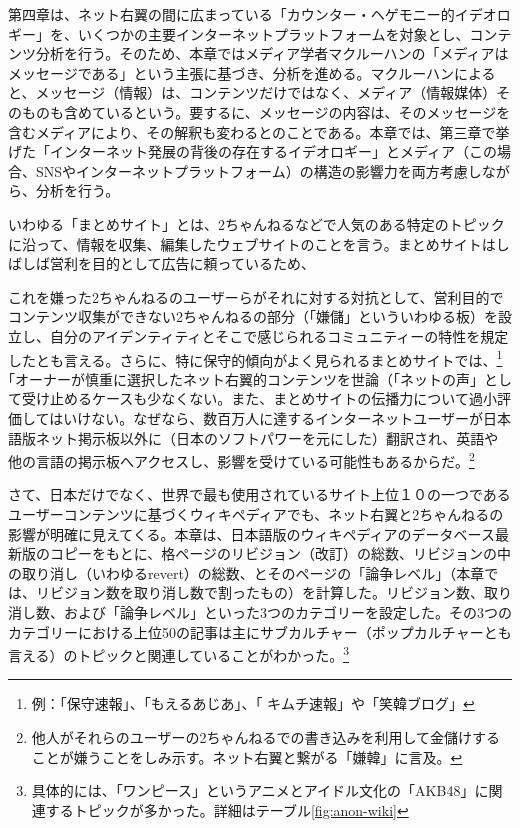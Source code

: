 \documentclass[10pt,british,A4paper,oneside]{memoir}
\begin{document}
第四章は、ネット右翼の間に広まっている「カウンター・ヘゲモニー的イデオロギー」を、いくつかの主要インターネットプラットフォームを対象とし、コンテンツ分析を行う。そのため、本章ではメディア学者マクルーハンの「メディアはメッセージである」という主張に基づき、分析を進める。マクルーハンによると、メッセージ（情報）は、コンテンツだけではなく、メディア（情報媒体）そのものも含めているという。要するに、メッセージの内容は、そのメッセージを含むメディアにより、その解釈も変わるとのことである。本章では、第三章で挙げた「インターネット発展の背後の存在するイデオロギー」とメディア（この場合、SNSやインターネットプラットフォーム）の構造の影響力を両方考慮しながら、分析を行う。

いわゆる「まとめサイト」とは、2ちゃんねるなどで人気のある特定のトピックに沿って、情報を収集、編集したウェブサイトのことを言う。まとめサイトはしばしば営利を目的として広告に頼っているため、

これを嫌った2ちゃんねるのユーザーらがそれに対する対抗として、営利目的でコンテンツ収集ができない2ちゃんねるの部分（「嫌儲」といういわゆる板）を設立し、自分のアイデンティティとそこで感じられるコミュニティーの特性を規定したとも言える。さらに、特に保守的傾向がよく見られるまとめサイトでは、\footnote{例：「保守速報」、「もえるあじあ」、「
  キムチ速報」や「笑韓ブログ」}｢オーナーが慎重に選択したネット右翼的コンテンツを世論（「ネットの声」として受け止めるケースも少なくない。また、まとめサイトの伝播力について過小評価してはいけない。なぜなら、数百万人に達するインターネットユーザーが日本語版ネット掲示板以外に（日本のソフトパワーを元にした）翻訳され、英語や他の言語の掲示板へアクセスし、影響を受けている可能性もあるからだ。\footnote{他人がそれらのユーザーの2ちゃんねるでの書き込みを利用して金儲けすることが嫌うことをしみ示す。ネット右翼と繋がる「嫌韓」に言及。}

さて、日本だけでなく、世界で最も使用されているサイト上位１０の一つであるユーザーコンテンツに基づくウィキペディアでも、ネット右翼と2ちゃんねるの影響が明確に見えてくる。本章は、日本語版のウィキペディアのデータベース最新版のコピーをもとに、格ページのリビジョン（改訂）の総数、リビジョンの中の取り消し（いわゆるrevert）の総数、とそのページの「論争レベル」（本章では、リビジョン数を取り消し数で割ったもの）を計算した。リビジョン数、取り消し数、および「論争レベル」といった3つのカテゴリーを設定した。その3つのカテゴリーにおける上位50の記事は主にサブカルチャー（ポップカルチャーとも言える）のトピックと関連していることがわかった。\footnote{具体的には、「ワンピース」というアニメとアイドル文化の「AKB48」に関連するトピックが多かった。詳細はテーブル\ref{fig:anon-wiki}}
\end{document}
